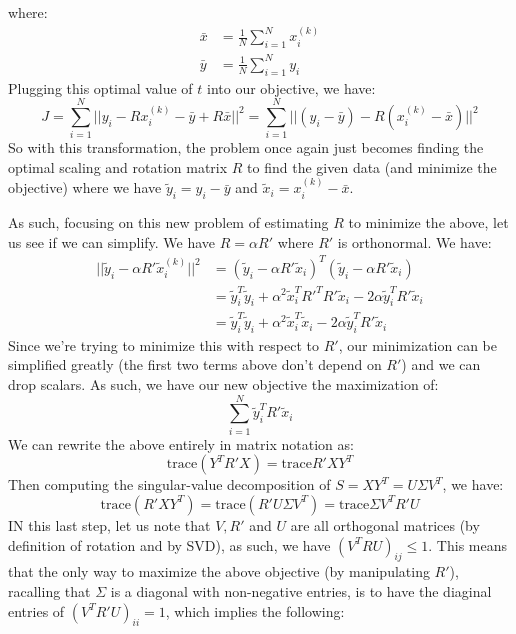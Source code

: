 \documentclass[12pt]{exam}
\begin{document}
\begin{questions}
\begin{solution}
\begin{enumerate}[label=(\alph*)]
       where:
       \begin{align*}
        \bar{x} &=  \frac{1}{N} \sum_{i=1}^N x_i^{(k)} \\
        \bar{y} &= \frac{1}{N} \sum_{i=1}^N y_i
       \end{align*}
       Plugging this optimal value of $t$ into our objective, we have:
       \[
          J = \sum_{i=1}^N ||y_i - Rx_i^{(k)} - \bar{y} + R\bar{x}||^2 = \sum_{i=1}^N ||(y_i - \bar{y}) - R(x_i^{(k)} -\bar{x})||^2
       \]
       So with this transformation, the problem once again just becomes finding the optimal scaling and rotation matrix $R$ to find the given data (and minimize the objective) where we have $\tilde{y}_i = y_i - \bar{y}$ and $\tilde{x}_i = x_i^{(k)} - \bar{x}$.


       As such, focusing on this new problem of estimating $R$ to minimize the above, let us see if we can simplify. We have $R = \alpha R'$ where $R'$ is orthonormal. We have:
       \begin{align*}
        ||\tilde{y}_i - \alpha R'\tilde{x}_i^{(k)}||^2 &= (\tilde{y}_i - \alpha R'\tilde{x}_i)^T(\tilde{y}_i - \alpha R'\tilde{x}_i) \\
        &=\tilde{y}_i^T\tilde{y}_i + \alpha^2 \tilde{x}_i^TR'^TR'\tilde{x}_i - 2\alpha \tilde{y}_i^TR'\tilde{x}_i \tag{Last term is scalar, so $a^T =a $} \\
        &= \tilde{y}_i^T\tilde{y}_i + \alpha^2 \tilde{x}_i^T\tilde{x}_i - 2\alpha \tilde{y}_i^TR'\tilde{x}_i \tag{$R'^TR' = I$} 
       \end{align*}
       Since we're trying to minimize this with respect to $R'$, our minimization can be simplified greatly (the first two terms above don't depend on $R'$) and we can drop scalars. As such, we have our new objective the maximization of:
       \[
        \sum_{i=1}^N \tilde{y}_i^TR'\tilde{x}_i
       \]
       We can rewrite the above entirely in matrix notation as:
       \[
        \text{trace} (Y^TR'X) = \text{trace}{R'XY^T}
       \]
       Then computing the singular-value decomposition of $S = XY^T = U\Sigma V^T$, we have:
       \[
        \text{trace}(R'XY^T) = \text{trace}(R'U\Sigma V^T) = \text{trace}{\Sigma V^T R' U}
       \]
       IN this last step, let us note that $V,R'$ and $U$ are all orthogonal matrices (by definition of rotation and by SVD), as such, we have $(V^TRU)_{ij} \leq 1$. This means that the only way to maximize the above objective (by manipulating $R'$), racalling that $\Sigma$ is a diagonal with non-negative entries, is to have the diaginal entries of $(V^TR'U)_{ii} = 1$, which implies the following:

\end{enumerate}
\end{solution}
\end{questions}
\end{document}
